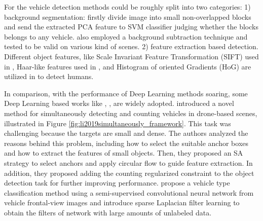 \documentclass[10pt,twocolumn,letterpaper]{article}  %
\begin{document}
For the vehicle detection methods could be roughly split into two categories: 1) background segmentation: \cite{zhou2007moving} firstly divide image into small non-overlapped blocks and send the extracted PCA feature to SVM classifier judging whether the blocks belongs to any vehicle.  \cite{xu2016background} also employed a background subtraction technique and tested to be valid on various kind of scenes. 2) feature extraction based detection. Different object features, like Scale Invariant Feature Transformation (SIFT) used in \cite{mu2016multiple}, Haar-like features used in \cite{han2009vehicle}, and Histogram of oriented Gradients (HoG) are utilized in \cite{dalal2005histograms} to detect humans. 

In comparison, with the performance of Deep Learning methods soaring, some Deep Learning based works like \cite{li2019simultaneously}, \cite{zhu2018urban}, \cite{micheal2019automatic} are widely adopted.
\cite{li2019simultaneously} introduced a novel method for simultaneously detecting and counting vehicles in drone-based scenes, illustrated in Figure \ref{fig:li2019simultaneously_framework}. This task was challenging because the targets are small and dense. The authors analyzed the reasons behind this problem, including how to select the suitable anchor boxes and how to extract the features of small objects. Then, they proposed an SA strategy to select anchors and apply circular flow to guide feature extraction. In addition, they proposed adding the counting regularized constraint to the object detection task for further improving performance. \cite{dong2015vehicle} propose a vehicle type classification method using a semi-supervised convolutional neural network from vehicle frontal-view images and introduce sparse Laplacian filter learning to obtain the filters of network with large amounts of unlabeled data. 
\end{document}

